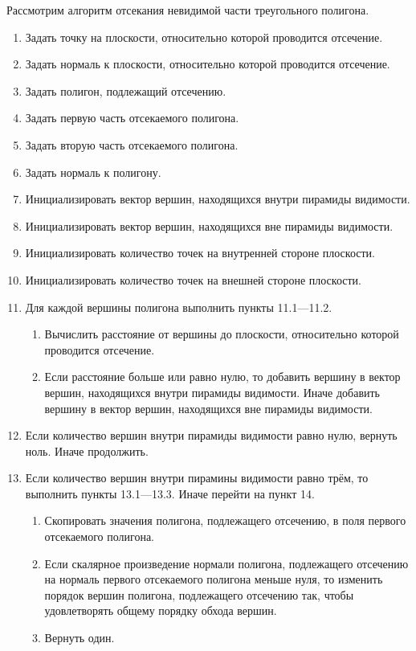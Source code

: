 Рассмотрим алгоритм отсекания невидимой части треугольного полигона.
\begin{enumerate}
\item Задать точку на плоскости, относительно которой проводится отсечение.
\item Задать нормаль к плоскости, относительно которой проводится отсечение.
\item Задать полигон, подлежащий отсечению.
\item Задать первую часть отсекаемого полигона.
\item Задать вторую часть отсекаемого полигона.
\item Задать нормаль к полигону.
\item Инициализировать вектор вершин, находящихся внутри пирамиды видимости.
\item Инициализировать вектор вершин, находящихся вне пирамиды видимости.
\item Инициализировать количество точек на внутренней стороне плоскости.
\item Инициализировать количество точек на внешней стороне плоскости.
\item Для каждой вершины полигона выполнить пункты 11.1---11.2.
\begin{enumerate}
\item Вычислить расстояние от вершины до плоскости, относительно которой проводится отсечение.
\item Если расстояние больше или равно нулю, то добавить вершину в вектор вершин, находящихся внутри пирамиды видимости. Иначе добавить вершину в вектор вершин, находящихся вне пирамиды видимости.
\end{enumerate}
\item Если количество вершин внутри пирамиды видимости равно нулю, вернуть ноль. Иначе продолжить.
\item Если количество вершин внутри пирамины видимости равно трём, то выполнить пункты 13.1---13.3. Иначе перейти на пункт 14.
\begin{enumerate}
\item Скопировать значения полигона, подлежащего отсечению, в поля первого отсекаемого полигона.
\item Если скалярное произведение нормали полигона, подлежащего отсечению на нормаль первого отсекаемого полигона меньше нуля, то изменить порядок вершин полигона, подлежащего отсечению так, чтобы удовлетворять общему порядку обхода вершин.
\item Вернуть один.
\end{enumerate}

\end{enumerate}
